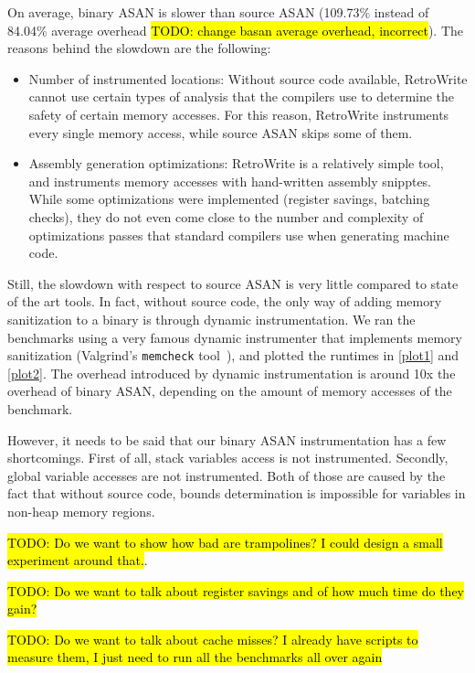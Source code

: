 \documentclass[a4paper,11pt,oneside]{report}
\newcommand{\sysname}{RetroWrite\xspace}
\DeclareRobustCommand{\todo}[1]{{\sethlcolor{cyan}\hl{TODO: #1}}}
\begin{document}
On average, binary ASAN is slower than source ASAN (109.73\% instead of 84.04\%
average overhead \todo{change basan average overhead, incorrect}). The reasons
behind the slowdown are the following:
\begin{itemize}
	\item Number of instrumented locations: Without source code available,
		\sysname cannot use certain types of analysis that the compilers use to 
		determine the safety of certain memory accesses. For this reason, \sysname
		instruments every single memory access, while source ASAN skips some of them.
	\item Assembly generation optimizations: \sysname is a relatively simple tool, 
		and instruments memory accesses with hand-written assembly snipptes. While
		some optimizations were implemented (register savings, batching checks), they
		do not even come close to the number and complexity of optimizations passes that
		standard compilers use when generating machine code. 
\end{itemize}
Still, the slowdown with respect to source ASAN is very little compared to state of the art tools.
In fact, without source code, the only way of adding memory sanitization to a binary is through
dynamic instrumentation. We ran the benchmarks using a very famous dynamic instrumenter that implements
memory sanitization (Valgrind's \texttt{memcheck} tool~\cite{valgrind}), and plotted the runtimes in
\autoref{plot1} and \autoref{plot2}. The overhead introduced by dynamic instrumentation is around 10x the 
overhead of binary ASAN, depending on the amount of memory accesses of the benchmark. 

However, it needs to be said that our binary ASAN instrumentation has a few shortcomings. First of all,
stack variables access is not instrumented. Secondly, global variable accesses are not instrumented. Both
of those are caused by the fact that without source code, bounds determination is impossible for variables
in non-heap memory regions. 

\todo{Do we want to show how bad are trampolines? I could design a small experiment around that.}.


\todo{Do we want to talk about register savings and of how much time do they gain?}


\todo{Do we want to talk about cache misses? I already have scripts to measure them, I just need to 
run all the benchmarks all over again}
\end{document}
